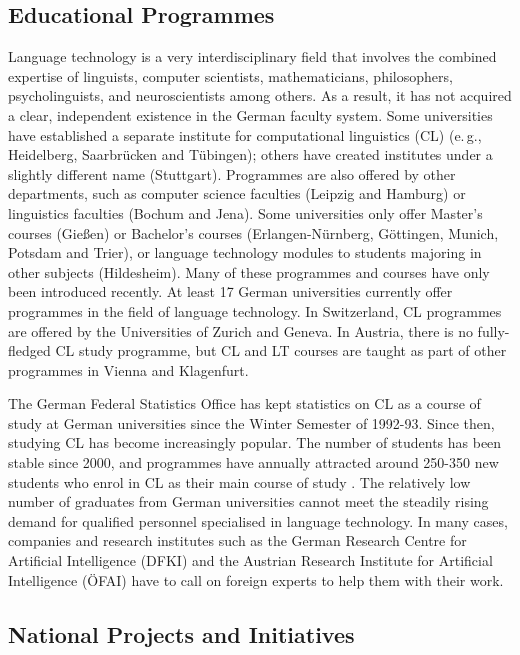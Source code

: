 \documentclass[]{../../metanetpaper}
\begin{document}
\begin{multicols}{2}
\subsection{Educational Programmes}

Language technology is a very interdisciplinary field that involves the combined expertise of linguists, computer scientists, mathematicians, philosophers, psycholinguists, and neuroscientists among others. As a result, it has not acquired a clear, independent existence in the German faculty system. Some universities have established a separate institute for computational linguistics (CL) (e.\,g., Heidelberg, Saarbrücken and Tübingen); others have created institutes under a slightly different name (Stuttgart). Programmes are also offered by other departments, such as computer science faculties (Leipzig and Hamburg) or linguistics faculties (Bochum and Jena). Some universities only offer Master’s courses (Gießen) or Bachelor’s courses (Erlangen-Nürnberg, Göttingen, Munich, Potsdam and Trier), or language technology modules to students majoring in other subjects (Hildesheim). Many of these programmes and courses have only been introduced recently. At least 17 German universities currently offer programmes in the field of language technology. In Switzerland, CL programmes are offered by the Universities of Zurich and Geneva. In Austria, there is no fully-fledged CL study programme, but CL and LT courses are taught as part of other programmes in Vienna and Klagenfurt.

The German Federal Statistics Office has kept statistics on CL as a course of study at German universities since the Winter Semester of 1992-93. Since then, studying CL has become increasingly popular. The number of students has been stable since 2000, and programmes have annually attracted around 250-350 new students who enrol in CL as their main course of study \cite{wie1}. The relatively low number of graduates from German universities cannot meet the steadily rising demand for qualified personnel specialised in language technology. In many cases, companies and research institutes such as the German Research Centre for Artificial Intelligence (DFKI) and the Austrian Research Institute for Artificial Intelligence (ÖFAI) have to call on foreign experts to help them with their work.

\subsection{National Projects and Initiatives}


\end{multicols}
\end{document}
